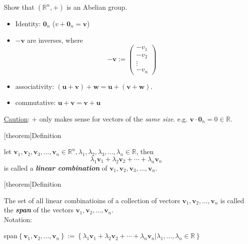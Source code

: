 \documentclass[12pt]{report}
\theoremstyle{definition}
\begin{document}
\begin{ex}
    Show that $(\mathbb{R}^{n}, +)$ is an Abelian group.
    \begin{itemize}
        \item Identity: $\mathbf{0}_n$ ($v + \mathbf{0}_n = \mathbf{v}$)
        \item $-\mathbf{v}$ are inverses, where \[
            -\mathbf{v} := \begin{pmatrix}
                    -v_1\\
                    -v_2\\
                    \vdots\\
                    -v_n
            \end{pmatrix}
        \]
        \item associativity: $(\mathbf{u} + \mathbf{v}) + \mathbf{w} = \mathbf{u} + (\mathbf{v} + \mathbf{w})$.
        \item commutative: $\mathbf{u} + \mathbf{v} = \mathbf{v} + \mathbf{u}$
    \end{itemize}
    \underline{Caution}: $+$ only makes sense for vectors of the \emph{same size}.
    e.g. $\mathbf{v} \cdot \mathbf{0}_n = 0 \in \mathbb{R}$.
\end{ex}

[theorem]{Definition}
\begin{combination of add and scalar multi}
    let $\mathbf{v}_1, \mathbf{v}_2, \mathbf{v}_3, \ldots, \mathbf{v}_n \in \mathbb{R}^{n}, \lambda_1, \lambda_2, \lambda_3, \ldots, \lambda_n \in \mathbb{R}$,
    then \[
        \lambda_1 \mathbf{v}_1 + \lambda_2 \mathbf{v}_2 + \cdots + \lambda_n \mathbf{v}_n
    \]is called a \textbf{\emph{linear combination}} of $\mathbf{v}_1, \mathbf{v}_2, \mathbf{v}_3, \ldots, \mathbf{v}_n$.
\end{combination of add and scalar multi}

[theorem]{Definition}
\begin{span of vectors}
    The set of all linear combinatioins of a collection of vectors $\mathbf{v}_1, \mathbf{v}_2, \ldots, \mathbf{v}_n$
    is called the \textbf{\emph{span}} of the vectors $\mathbf{v}_1, \mathbf{v}_2, \ldots, \mathbf{v}_n$.
    \\Notation: 
    
    span$\left\{\mathbf{v}_1, \mathbf{v}_2,\ldots,\mathbf{v}_n\right\} := 
    \left\{\lambda_1 \mathbf{v}_1 + \lambda_2 \mathbf{v}_2 + \cdots + \lambda_n \mathbf{v}_n 
    | \lambda_1, \ldots, \lambda_n \in \mathbb{R}\right\}$
\end{span of vectors}
\end{document}
